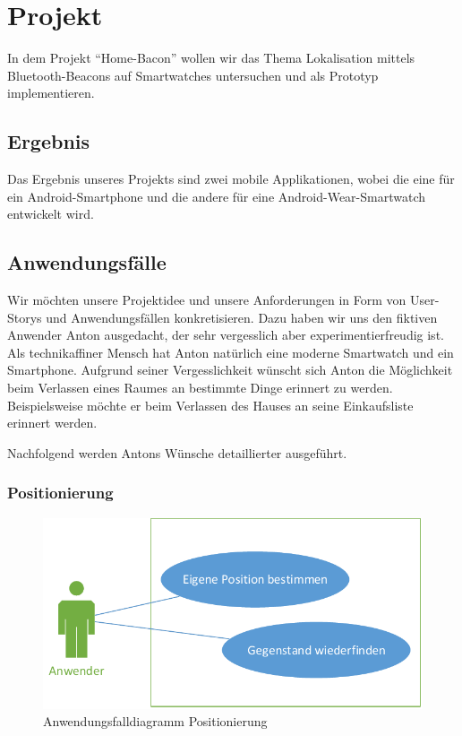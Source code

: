 \section{Projekt}

In dem Projekt "`Home-Bacon"' wollen wir das Thema Lokalisation mittels Bluetooth-Beacons auf Smartwatches untersuchen und als Prototyp implementieren.

\subsection{Ergebnis}
Das Ergebnis unseres Projekts sind zwei mobile Applikationen, wobei die eine für ein Android-Smartphone und die andere für eine Android-Wear-Smartwatch entwickelt wird.

\subsection{Anwendungsfälle}
Wir möchten unsere Projektidee und unsere Anforderungen in Form von User-Storys und Anwendungsfällen konkretisieren. Dazu haben wir uns den fiktiven Anwender Anton ausgedacht, der sehr vergesslich aber experimentierfreudig ist. Als technikaffiner Mensch hat Anton natürlich eine moderne Smartwatch und ein Smartphone. Aufgrund seiner Vergesslichkeit wünscht sich Anton die Möglichkeit beim Verlassen eines Raumes an bestimmte Dinge erinnert zu werden. Beispielsweise möchte er beim Verlassen des Hauses an seine Einkaufsliste erinnert werden.

Nachfolgend werden Antons Wünsche detaillierter ausgeführt.

\subsubsection{Positionierung}
\begin{figure}[H]
\centering
\includegraphics[width=0.7\linewidth]{Bilder/UseCase-Position}
\caption{Anwendungsfalldiagramm Positionierung}
\label{fig:UseCase-Position}
\end{figure}

